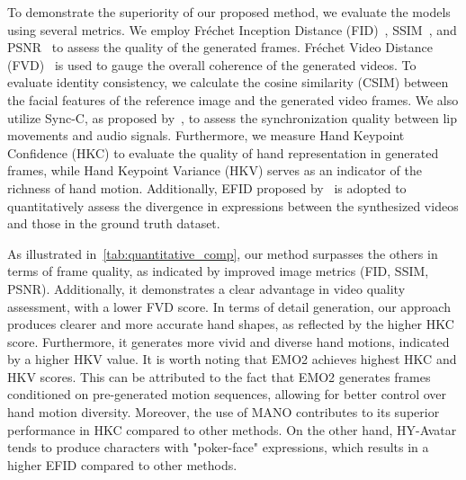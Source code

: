 To demonstrate the superiority of our proposed method, we evaluate the models using several metrics. We employ Fréchet Inception Distance (FID)~\cite{fid}, SSIM~\cite{ssim}, and PSNR~\cite{psnr} to assess the quality of the generated frames. Fréchet Video Distance (FVD)~\cite{fvd} is used to gauge the overall coherence of the generated videos. To evaluate identity consistency, we calculate the cosine similarity (CSIM) between the facial features of the reference image and the generated video frames. We also utilize Sync-C, as proposed by~\cite{syncnet}, to assess the synchronization quality between lip movements and audio signals. Furthermore, we measure Hand Keypoint Confidence (HKC) to evaluate the quality of hand representation in generated frames, while Hand Keypoint Variance (HKV) serves as an indicator of the richness of hand motion. Additionally, EFID proposed by~\cite{tian2025emo} is adopted to quantitatively assess the divergence in expressions between the synthesized videos and those in the ground truth dataset.

As illustrated in~\ref{tab:quantitative_comp}, our method surpasses the others in terms of frame quality, as indicated by improved image metrics (FID, SSIM, PSNR). Additionally, it demonstrates a clear advantage in video quality assessment, with a lower FVD score. In terms of detail generation, our approach produces clearer and more accurate hand shapes, as reflected by the higher HKC score. Furthermore, it generates more vivid and diverse hand motions, indicated by a higher HKV value.
It is worth noting that EMO2 achieves highest HKC and HKV scores. This can be attributed to the fact that EMO2 generates frames conditioned on pre-generated motion sequences, allowing for better control over hand motion diversity. Moreover, the use of MANO contributes to its superior performance in HKC compared to other methods. On the other hand, HY-Avatar tends to produce characters with "poker-face" expressions, which results in a higher EFID compared to other methods.


